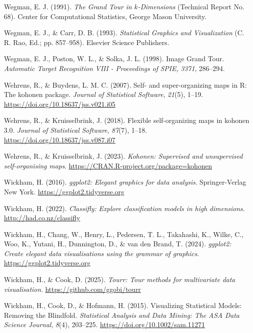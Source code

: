 \documentclass[
  letterpaper,
]{krantz}
\newlength{\cslhangindent}
\newenvironment{CSLReferences}[2] %
 {\begin{list}{}{%
  \setlength{\itemindent}{0pt}
  \setlength{\leftmargin}{0pt}
  \setlength{\parsep}{0pt}
  \ifodd #1
   \setlength{\leftmargin}{\cslhangindent}
   \setlength{\itemindent}{-1\cslhangindent}
  \fi
  \setlength{\itemsep}{#2\baselineskip}}}
 {\end{list}}
\begin{document}
\begin{CSLReferences}{1}{0}
Wegman, E. J. (1991). \emph{The {G}rand {T}our in \(k\)-{D}imensions}
(Technical Report No. 68). Center for Computational Statistics, George
Mason University.

Wegman, E. J., \& Carr, D. B. (1993). \emph{{S}tatistical {G}raphics and
{V}isualization} (C. R. Rao, Ed.; pp. 857--958). Elsevier Science
Publishers.

Wegman, E. J., Poston, W. L., \& Solka, J. L. (1998). Image {G}rand
{T}our. \emph{Automatic Target Recognition VIII - Proceedings of SPIE,
3371}, 286--294.

Wehrens, R., \& Buydens, L. M. C. (2007). Self- and super-organizing
maps in {R}: The {kohonen} package. \emph{Journal of Statistical
Software}, \emph{21}(5), 1--19.
\url{https://doi.org/10.18637/jss.v021.i05}

Wehrens, R., \& Kruisselbrink, J. (2018). Flexible self-organizing maps
in {kohonen} 3.0. \emph{Journal of Statistical Software}, \emph{87}(7),
1--18. \url{https://doi.org/10.18637/jss.v087.i07}

Wehrens, R., \& Kruisselbrink, J. (2023). \emph{Kohonen: Supervised and
unsupervised self-organising maps}.
\url{https://CRAN.R-project.org/package=kohonen}

Wickham, H. (2016). \emph{ggplot2: Elegant graphics for data analysis}.
Springer-Verlag New York. \url{https://ggplot2.tidyverse.org}

Wickham, H. (2022). \emph{Classifly: Explore classification models in
high dimensions}. \url{http://had.co.nz/classifly}

Wickham, H., Chang, W., Henry, L., Pedersen, T. L., Takahashi, K.,
Wilke, C., Woo, K., Yutani, H., Dunnington, D., \& van den Brand, T.
(2024). \emph{ggplot2: Create elegant data visualisations using the
grammar of graphics}. \url{https://ggplot2.tidyverse.org}

Wickham, H., \& Cook, D. (2025). \emph{Tourr: Tour methods for
multivariate data visualisation}. \url{https://github.com/ggobi/tourr}

Wickham, H., Cook, D., \& Hofmann, H. (2015). Visualizing {S}tatistical
{M}odels: {R}emoving the {B}lindfold. \emph{Statistical Analysis and
Data Mining: The ASA Data Science Journal}, \emph{8}(4), 203--225.
\url{https://doi.org/10.1002/sam.11271}


\end{CSLReferences}
\end{document}
